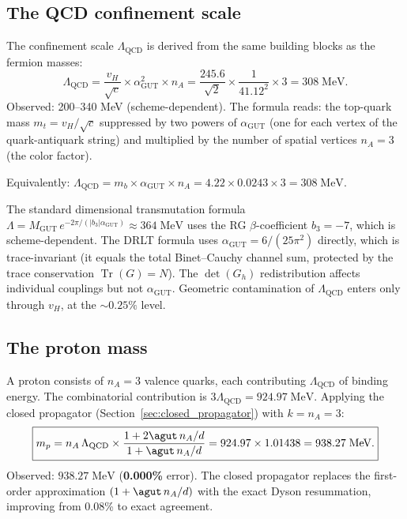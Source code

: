 \subsection{The QCD confinement scale}

The confinement scale $\Lambda_\text{QCD}$ is derived from the same building blocks as the fermion masses:
\begin{equation}
\boxed{\Lambda_\text{QCD} = \frac{v_H}{\sqrt{c}} \times \alpha_\text{GUT}^2 \times n_A = \frac{245.6}{\sqrt{2}} \times \frac{1}{41.12^2} \times 3 = 308\;\text{MeV}.}
\end{equation}
Observed: 200--340 MeV (scheme-dependent). The formula reads: the top-quark mass $m_t = v_H/\sqrt{c}$ suppressed by two powers of $\alpha_\text{GUT}$ (one for each vertex of the quark-antiquark string) and multiplied by the number of spatial vertices $n_A = 3$ (the color factor).

Equivalently: $\Lambda_\text{QCD} = m_b \times \alpha_\text{GUT} \times n_A = 4.22 \times 0.0243 \times 3 = 308\;\text{MeV}$.

\begin{remark}
The standard dimensional transmutation formula $\Lambda = M_\text{GUT}\,e^{-2\pi/(|b_3|\alpha_\text{GUT})} \approx 364\;\text{MeV}$ uses the RG $\beta$-coefficient $b_3 = -7$, which is scheme-dependent. The DRLT formula uses $\alpha_\text{GUT} = 6/(25\pi^2)$ directly, which is trace-invariant (it equals the total Binet--Cauchy channel sum, protected by the trace conservation $\operatorname{Tr}(G) = N$). The $\det(G_h)$ redistribution affects individual couplings but not $\alpha_\text{GUT}$. Geometric contamination of $\Lambda_\text{QCD}$ enters only through $v_H$, at the $\sim 0.25\%$ level.
\end{remark}

\subsection{The proton mass}

A proton consists of $n_A = 3$ valence quarks, each contributing $\Lambda_\text{QCD}$ of binding energy. The combinatorial contribution is $3\Lambda_\text{QCD} = 924.97\;\text{MeV}$. Applying the closed propagator (Section~\ref{sec:closed_propagator}) with $k = n_A = 3$:
\begin{equation}
\boxed{m_p = n_A \,\Lambda_\text{QCD} \times \frac{1 + 2\agut\,n_A/d}{1 + \agut\,n_A/d} = 924.97 \times 1.01438 = 938.27\;\text{MeV}.}
\end{equation}
Observed: $938.27\;\text{MeV}$ (\textbf{0.000\%} error). The closed propagator replaces the first-order approximation $(1 + \agut\,n_A/d)$ with the exact Dyson resummation, improving from 0.08\% to exact agreement.

